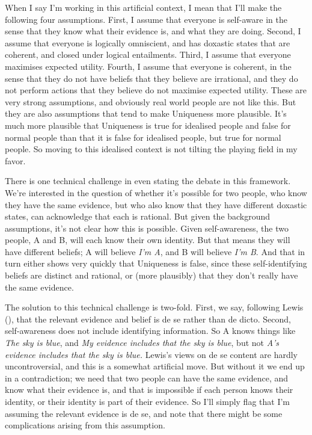 \documentclass[
  11pt,
  letterpaper,
  DIV=11,
  numbers=noendperiod,
  twoside]{scrartcl}
\begin{document}
When I say I'm working in this artificial context, I mean that I'll make
the following four assumptions. First, I assume that everyone is
self-aware in the sense that they know what their evidence is, and what
they are doing. Second, I assume that everyone is logically omniscient,
and has doxastic states that are coherent, and closed under logical
entailments. Third, I assume that everyone maximises expected utility.
Fourth, I assume that everyone is coherent, in the sense that they do
not have beliefs that they believe are irrational, and they do not
perform actions that they believe do not maximise expected utility.
These are very strong assumptions, and obviously real world people are
not like this. But they are also assumptions that tend to make
Uniqueness more plausible. It's much more plausible that Uniqueness is
true for idealised people and false for normal people than that it is
false for idealised people, but true for normal people. So moving to
this idealised context is not tilting the playing field in my favor.

There is one technical challenge in even stating the debate in this
framework. We're interested in the question of whether it's possible for
two people, who know they have the same evidence, but who also know that
they have different doxastic states, can acknowledge that each is
rational. But given the background assumptions, it's not clear how this
is possible. Given self-awareness, the two people, A and B, will each
know their own identity. But that means they will have different
beliefs; A will believe \emph{I'm A}, and B will believe \emph{I'm B}.
And that in turn either shows very quickly that Uniqueness is false,
since these self-identifying beliefs are distinct and rational, or (more
plausibly) that they don't really have the same evidence.

The solution to this technical challenge is two-fold. First, we say,
following Lewis (), that the relevant
evidence and belief is de se rather than de dicto. Second,
self-awareness does not include identifying information. So A knows
things like \emph{The sky is blue}, and \emph{My evidence includes that
the sky is blue}, but not \emph{A's evidence includes that the sky is
blue.} Lewis's views on de se content are hardly uncontroversial, and
this is a somewhat artificial move. But without it we end up in a
contradiction; we need that two people can have the same evidence, and
know what their evidence is, and that is impossible if each person knows
their identity, or their identity is part of their evidence. So I'll
simply flag that I'm assuming the relevant evidence is de se, and note
that there might be some complications arising from this assumption.
\end{document}
